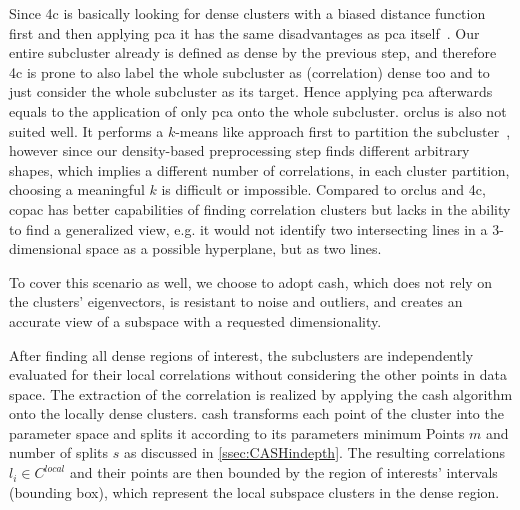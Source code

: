 Since \gls{4c} is basically looking for dense clusters with a biased distance function first and then applying \gls{pca} it has the same disadvantages as \gls{pca} itself~\cite{4cbohm2004computing}. Our entire subcluster already is defined as dense by the previous step, and therefore \gls{4c} is prone to also label the whole subcluster as (correlation) dense too and to just consider the whole subcluster as its target. Hence applying \gls{pca} afterwards equals to the application of only \gls{pca} onto the whole subcluster. 
\gls{orclus} is also not suited well. It performs a $k$-means like approach first to partition the subcluster~\cite{orclusaggarwal2000finding}, however since our density-based preprocessing step finds different arbitrary shapes, which implies a different number of correlations, in each cluster partition, choosing a meaningful $k$ is difficult or impossible. 
Compared to \gls{orclus} and \gls{4c}, \gls{copac} has better capabilities of finding correlation clusters but lacks in the ability to find a generalized view, e.g. it would not identify two intersecting lines in a 3-dimensional space as a possible hyperplane, but as two lines. 

To cover this scenario as well, we choose to adopt \gls{cash}, which does not rely on the clusters' eigenvectors, is resistant to noise and outliers, and creates an accurate view of a subspace with a requested dimensionality.

After finding all dense regions of interest, the subclusters are independently evaluated for their local correlations without considering the other points in data space. 
The extraction of the correlation is realized by applying the \gls{cash} algorithm onto the locally dense clusters. 
\gls{cash} transforms each point of the cluster into the parameter space and splits it according to its parameters minimum Points $m$ and number of splits $s$ as discussed in \autoref{ssec:CASHindepth}. 
The resulting correlations $l_i \in C^{local}$ and their points are then bounded by the region of interests' intervals (bounding box), which represent the local subspace clusters in the dense region.


